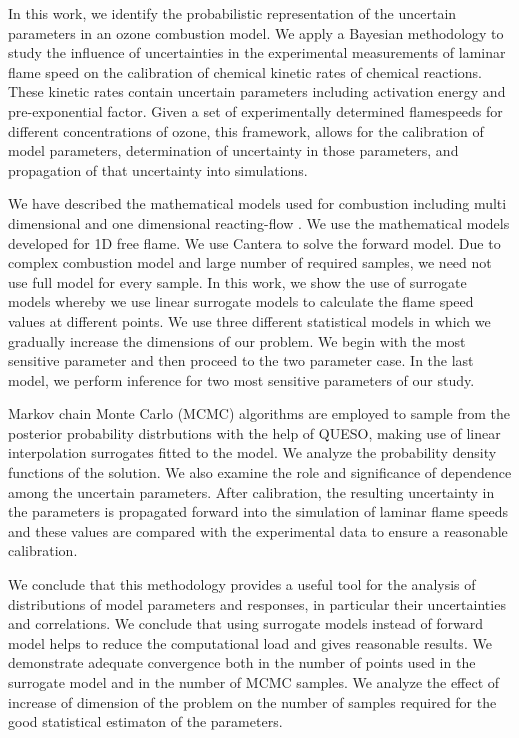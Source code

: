 

In this work, we identify the probabilistic representation of the uncertain parameters in an ozone combustion model. We  apply a Bayesian methodology to study the influence of
uncertainties in the experimental measurements of laminar flame speed on the calibration of chemical kinetic rates of chemical reactions. These kinetic rates contain uncertain parameters including activation energy and pre-exponential factor. Given a set of experimentally determined flamespeeds for different concentrations of ozone, this framework, allows for the
calibration of model parameters, determination of uncertainty in those parameters, and propagation
of that uncertainty into simulations.

\bigskip

We have described the mathematical models used for combustion including multi dimensional and one dimensional reacting-flow . We use the mathematical models developed for 1D free flame. We use Cantera to solve the forward model. Due to complex combustion model and large number of required samples, we need not use full model for every sample. In this work, we show the use of surrogate models whereby we use linear surrogate models to calculate the flame speed values at different points. We use three different statistical models in which we gradually increase the dimensions of our problem. We begin with the most sensitive parameter and then proceed to the two parameter case. In the last model, we perform inference for two most sensitive parameters of our study.  


\bigskip


Markov chain Monte Carlo (MCMC) 
algorithms are employed to sample from the posterior probability distrbutions with the help of QUESO, making use of
linear  interpolation surrogates fitted to the model. We analyze the  probability density functions of the solution. We
also examine the role and significance of dependence among the uncertain parameters. After calibration, the resulting uncertainty in the parameters is propagated forward into
the simulation of laminar flame speeds and these values are compared with the experimental data to ensure a reasonable calibration.


\bigskip



We conclude that this methodology provides a useful tool for the analysis of distributions of model parameters and
responses, in particular their uncertainties and correlations. We conclude that using surrogate models instead of forward model helps to reduce the computational load and gives reasonable results. We demonstrate adequate convergence both in the number of points used in the surrogate model and in the number of MCMC samples. We analyze the effect of increase of dimension of the problem on the number of samples required for the good statistical estimaton of the parameters. 
